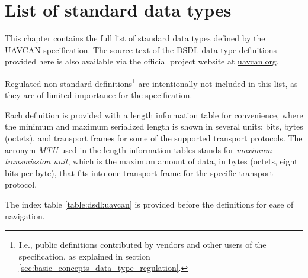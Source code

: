\chapter{List of standard data types}

This chapter contains the full list of standard data types defined by the UAVCAN specification.
The source text of the DSDL data type definitions provided here is also available via the
official project website at \href{http://uavcan.org}{uavcan.org}.

Regulated non-standard definitions\footnote{I.e., public definitions contributed by vendors and other users
of the specification, as explained in section \ref{sec:basic_concepts_data_type_regulation}.}
are intentionally not included in this list, as they are of limited importance for the specification.

Each definition is provided with a length information table for convenience,
where the minimum and maximum serialized length is shown in several units:
bits, bytes (octets), and transport frames for some of the supported transport protocols.
The acronym \emph{MTU} used in the length information tables stands for
\emph{maximum transmission unit}, which is the maximum amount of data, in bytes (octets, eight bits per byte),
that fits into one transport frame for the specific transport protocol.

The index table \ref{table:dsdl:uavcan} is provided before the definitions for ease of navigation.

\clearpage{}
